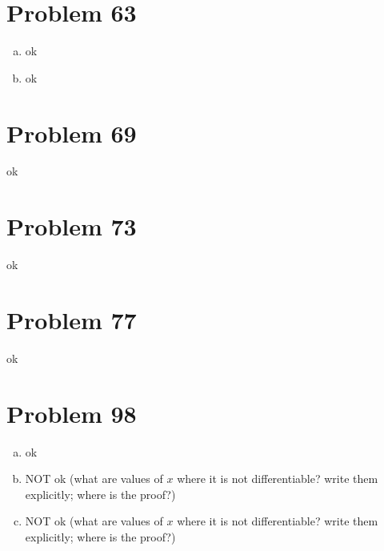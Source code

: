 \documentclass[10pt]{article} %
\begin{document}
\section*{Problem 63 }
\begin{enumerate}[(a)]
	\item ok
	\item ok
\end{enumerate}
\section*{Problem 69 }
ok

\section*{Problem 73 }
ok
\section*{Problem 77 }
ok
\section*{Problem 98 }
\begin{enumerate}[(a)]
	\item ok
	\item NOT ok (what are values of $x$ where it is not differentiable? write them explicitly;
		where is the proof?)
	\item NOT ok (what are values of $x$ where it is not differentiable? write them explicitly;
		where is the proof?)
\end{enumerate}
\end{document}
